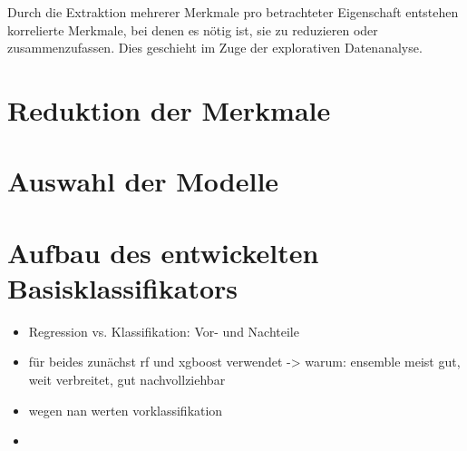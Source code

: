 Durch die Extraktion mehrerer Merkmale pro betrachteter Eigenschaft entstehen korrelierte Merkmale, bei denen es nötig ist, sie zu reduzieren oder zusammenzufassen. Dies geschieht im Zuge der explorativen Datenanalyse.

\section{Reduktion der Merkmale}

\section{Auswahl der Modelle}

\section{Aufbau des entwickelten Basisklassifikators}
\begin{itemize}
	\item Regression vs. Klassifikation: Vor- und Nachteile
	\item für beides zunächst rf und xgboost verwendet -> warum: ensemble meist gut, weit verbreitet, gut nachvollziehbar
	\item wegen nan werten vorklassifikation
	\item 
\end{itemize}





